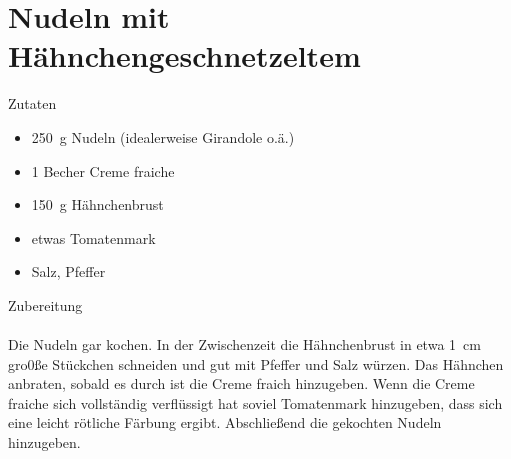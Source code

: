 \section*{Nudeln mit Hähnchengeschnetzeltem}
\ihead{}\ohead{}
\cfoot{}
{\Large Zutaten}
\begin{multicols}{2}
\begin{itemize}
    \item \SI{250}{g} Nudeln (idealerweise Girandole o.ä.)
    \item \num{1} Becher Creme fraiche
    \item \SI{150}{g} Hähnchenbrust
    \item etwas Tomatenmark
    \item Salz, Pfeffer
\end{itemize}
\end{multicols}
\noindent
{\Large Zubereitung}\\
\\
Die Nudeln gar kochen.
In der Zwischenzeit die Hähnchenbrust in etwa \SI{1}{cm} gro0ße Stückchen schneiden und gut mit Pfeffer und Salz würzen.
Das Hähnchen anbraten, sobald es durch ist die Creme fraich hinzugeben.
Wenn die Creme fraiche sich vollständig verflüssigt hat soviel Tomatenmark hinzugeben, dass sich eine leicht rötliche Färbung ergibt.
Abschließend die gekochten Nudeln hinzugeben.